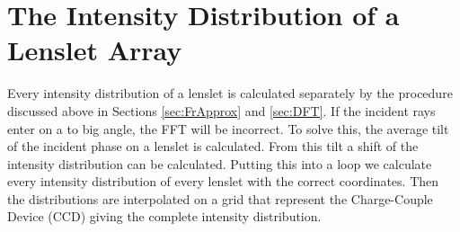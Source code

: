 \section{The Intensity Distribution of a Lenslet Array}
Every intensity distribution of a lenslet is calculated separately by the procedure discussed above in Sections \ref{sec:FrApprox} and \ref{sec:DFT}.
If the incident rays enter on a to big angle, the FFT will be incorrect. To solve this, the average tilt of the incident phase on a lenslet is calculated. From this tilt a shift of the intensity distribution can be calculated. Putting this into a loop we calculate every intensity distribution of every lenslet with the correct coordinates. Then the distributions are interpolated on a grid that represent the Charge-Couple Device (CCD) giving the complete intensity distribution. 

